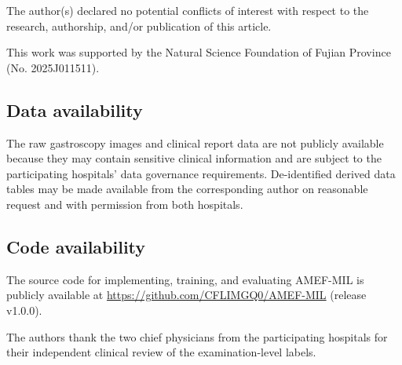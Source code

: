 \documentclass[Afour,sagev,times]{sagej}
\begin{document}
\begin{dci}
The author(s) declared no potential conflicts of interest with respect to the research, authorship, and/or publication of this article.
\end{dci}

\begin{funding}
This work was supported by the Natural Science Foundation of Fujian Province (No. 2025J011511).
\end{funding}

\subsection*{Data availability}

The raw gastroscopy images and clinical report data are not publicly available because they may contain sensitive clinical information and are subject to the participating hospitals' data governance requirements. De-identified derived data tables may be made available from the corresponding author on reasonable request and with permission from both hospitals.

\subsection*{Code availability}

The source code for implementing, training, and evaluating AMEF-MIL is publicly available at \href{https://github.com/CFLIMGQ0/AMEF-MIL}{https://github.com/CFLIMGQ0/AMEF-MIL} (release v1.0.0).

\begin{acks}
The authors thank the two chief physicians from the participating hospitals for their independent clinical review of the examination-level labels.
\end{acks}
\end{document}
